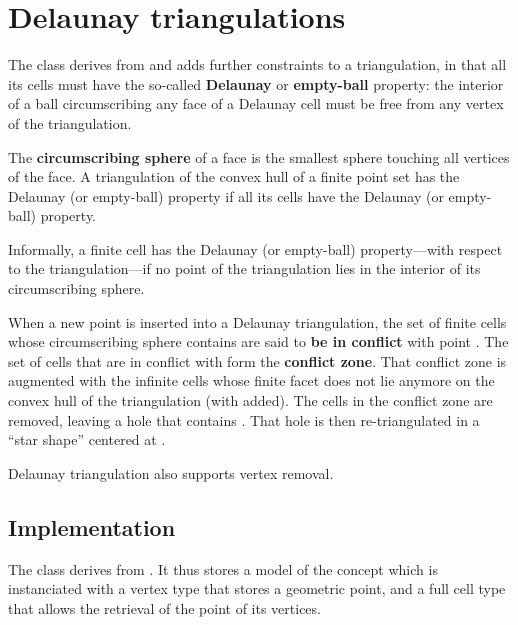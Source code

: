 
\section{Delaunay triangulations}%

The class  derives from
 and adds further constraints to a
triangulation, in that all its cells must have the so-called
\textbf{Delaunay} or \textbf{empty-ball} property: the interior of a ball
circumscribing any face of a Delaunay cell must be free from any vertex
of the triangulation.

The \textbf{circumscribing sphere} of a face  is the smallest sphere
touching all vertices of the face. A triangulation of the convex
hull of a finite point set has the Delaunay (or empty-ball) property if all
its cells have the Delaunay (or empty-ball) property.

Informally, a finite cell has the Delaunay (or empty-ball) property---with
respect to the triangulation---if no point of the triangulation lies in the interior of
its circumscribing sphere.

When a new point  is inserted into a Delaunay triangulation, the set of
finite cells whose circumscribing sphere contains  are said to
\textbf{be in conflict} with point . The set of cells that are in
conflict with  form the \textbf{conflict zone}. That conflict zone is
augmented with the infinite cells whose finite facet does not lie
anymore on the convex hull of the triangulation (with  added). The cells
in the conflict zone are removed, leaving a hole that contains . That
hole is then re-triangulated in a ``star shape'' centered at .

Delaunay triangulation also supports vertex removal.


\subsection{Implementation}

The class  derives from
. It thus stores a model  of
the concept  which is instanciated with a vertex
type that stores a geometric point, and a full cell type that allows the
retrieval of the point of its vertices.

